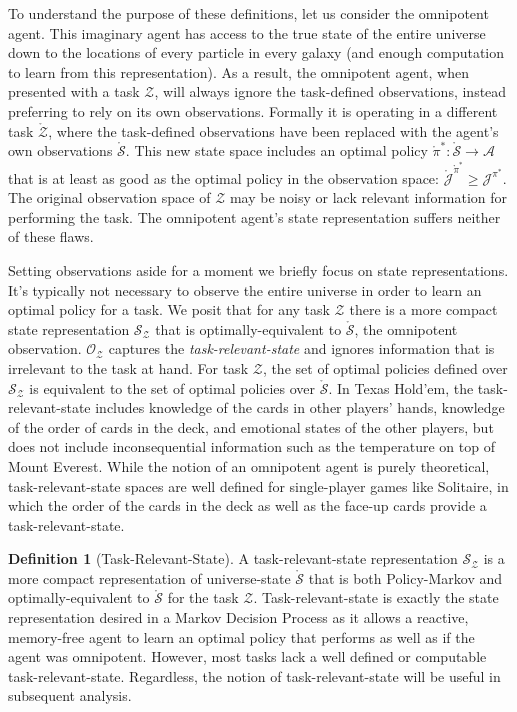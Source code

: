 \documentclass{article} %
\theoremstyle{definition}
\newtheorem{definition}{Definition}[section]
\begin{document}
To understand the purpose of these definitions, let us consider the
omnipotent agent. This imaginary agent has access to the true state of
the entire universe down to the locations of every particle in every
galaxy (and enough computation to learn from this representation). As
a result, the omnipotent agent, when presented with a task
$\mathcal{Z}$, will always ignore the task-defined observations,
instead preferring to rely on its own observations. Formally it is
operating in a different task $\mathring{\mathcal{Z}}$, where the
task-defined observations have been replaced with the agent's own
observations $\mathring{\mathcal{S}}$. This new state space
includes an optimal policy $\mathring{\pi}^*: \mathring{\mathcal{S}}
\rightarrow \mathcal{A}$ that is at least as good as the optimal
policy in the observation space:
$\mathring{\mathcal{J}}^{\mathring{\pi}^*} \ge
\mathcal{J}^{\pi^*}$. The original observation space of $\mathcal{Z}$
may be noisy or lack relevant information for performing the task. The
omnipotent agent's state representation suffers neither of these
flaws.

Setting observations aside for a moment we briefly focus on state
representations. It's typically not necessary to observe the entire
universe in order to learn an optimal policy for a task. We posit that
for any task $\mathcal{Z}$ there is a more compact state
representation $\mathcal{S}_\mathcal{Z}$ that is optimally-equivalent
to $\mathring{\mathcal{S}}$, the omnipotent
observation. $\mathcal{O}_\mathcal{Z}$ captures the
\textit{task-relevant-state} and ignores information that is
irrelevant to the task at hand. For task $\mathcal{Z}$, the set of
optimal policies defined over $\mathcal{S}_\mathcal{Z}$ is equivalent
to the set of optimal policies over $\mathring{\mathcal{S}}$. In Texas
Hold'em, the task-relevant-state includes knowledge of the cards in
other players' hands, knowledge of the order of cards in the deck, and
emotional states of the other players, but does not include
inconsequential information such as the temperature on top of Mount
Everest. While the notion of an omnipotent agent is purely
theoretical, task-relevant-state spaces are well defined for
single-player games like Solitaire, in which the order of the cards in
the deck as well as the face-up cards provide a
task-relevant-state.

\begin{definition}[Task-Relevant-State]
\label{def:taskRelState}
A task-relevant-state representation $\mathcal{S}_\mathcal{Z}$ is a
more compact representation of universe-state $\mathring{\mathcal{S}}$
that is both Policy-Markov and optimally-equivalent to
$\mathring{\mathcal{S}}$ for the task
$\mathcal{Z}$. Task-relevant-state is exactly the state representation
desired in a Markov Decision Process as it allows a reactive,
memory-free agent to learn an optimal policy that performs as well as
if the agent was omnipotent. However, most tasks lack a well defined
or computable task-relevant-state. Regardless, the notion of
task-relevant-state will be useful in subsequent analysis.
\end{definition}
\end{document}
